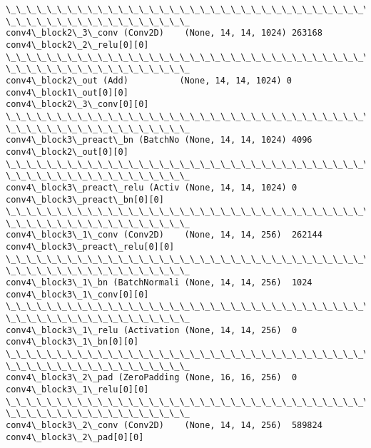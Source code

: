 \documentclass[11pt]{article}
\begin{document}
\begin{Verbatim}[commandchars=\\\{\}]
\_\_\_\_\_\_\_\_\_\_\_\_\_\_\_\_\_\_\_\_\_\_\_\_\_\_\_\_\_\_\_\_\_\_\_\_\_\_\_\_\_\_\_\_\_\_\_\_\_\_\_\_\_\_\_\_\_\_\_\_\_\_\_\_\_\_\_\_\_\_\_\_\_\_\_\_\_\_\_\_
\_\_\_\_\_\_\_\_\_\_\_\_\_\_\_\_\_\_
conv4\_block2\_3\_conv (Conv2D)    (None, 14, 14, 1024) 263168
conv4\_block2\_2\_relu[0][0]
\_\_\_\_\_\_\_\_\_\_\_\_\_\_\_\_\_\_\_\_\_\_\_\_\_\_\_\_\_\_\_\_\_\_\_\_\_\_\_\_\_\_\_\_\_\_\_\_\_\_\_\_\_\_\_\_\_\_\_\_\_\_\_\_\_\_\_\_\_\_\_\_\_\_\_\_\_\_\_\_
\_\_\_\_\_\_\_\_\_\_\_\_\_\_\_\_\_\_
conv4\_block2\_out (Add)          (None, 14, 14, 1024) 0
conv4\_block1\_out[0][0]
conv4\_block2\_3\_conv[0][0]
\_\_\_\_\_\_\_\_\_\_\_\_\_\_\_\_\_\_\_\_\_\_\_\_\_\_\_\_\_\_\_\_\_\_\_\_\_\_\_\_\_\_\_\_\_\_\_\_\_\_\_\_\_\_\_\_\_\_\_\_\_\_\_\_\_\_\_\_\_\_\_\_\_\_\_\_\_\_\_\_
\_\_\_\_\_\_\_\_\_\_\_\_\_\_\_\_\_\_
conv4\_block3\_preact\_bn (BatchNo (None, 14, 14, 1024) 4096
conv4\_block2\_out[0][0]
\_\_\_\_\_\_\_\_\_\_\_\_\_\_\_\_\_\_\_\_\_\_\_\_\_\_\_\_\_\_\_\_\_\_\_\_\_\_\_\_\_\_\_\_\_\_\_\_\_\_\_\_\_\_\_\_\_\_\_\_\_\_\_\_\_\_\_\_\_\_\_\_\_\_\_\_\_\_\_\_
\_\_\_\_\_\_\_\_\_\_\_\_\_\_\_\_\_\_
conv4\_block3\_preact\_relu (Activ (None, 14, 14, 1024) 0
conv4\_block3\_preact\_bn[0][0]
\_\_\_\_\_\_\_\_\_\_\_\_\_\_\_\_\_\_\_\_\_\_\_\_\_\_\_\_\_\_\_\_\_\_\_\_\_\_\_\_\_\_\_\_\_\_\_\_\_\_\_\_\_\_\_\_\_\_\_\_\_\_\_\_\_\_\_\_\_\_\_\_\_\_\_\_\_\_\_\_
\_\_\_\_\_\_\_\_\_\_\_\_\_\_\_\_\_\_
conv4\_block3\_1\_conv (Conv2D)    (None, 14, 14, 256)  262144
conv4\_block3\_preact\_relu[0][0]
\_\_\_\_\_\_\_\_\_\_\_\_\_\_\_\_\_\_\_\_\_\_\_\_\_\_\_\_\_\_\_\_\_\_\_\_\_\_\_\_\_\_\_\_\_\_\_\_\_\_\_\_\_\_\_\_\_\_\_\_\_\_\_\_\_\_\_\_\_\_\_\_\_\_\_\_\_\_\_\_
\_\_\_\_\_\_\_\_\_\_\_\_\_\_\_\_\_\_
conv4\_block3\_1\_bn (BatchNormali (None, 14, 14, 256)  1024
conv4\_block3\_1\_conv[0][0]
\_\_\_\_\_\_\_\_\_\_\_\_\_\_\_\_\_\_\_\_\_\_\_\_\_\_\_\_\_\_\_\_\_\_\_\_\_\_\_\_\_\_\_\_\_\_\_\_\_\_\_\_\_\_\_\_\_\_\_\_\_\_\_\_\_\_\_\_\_\_\_\_\_\_\_\_\_\_\_\_
\_\_\_\_\_\_\_\_\_\_\_\_\_\_\_\_\_\_
conv4\_block3\_1\_relu (Activation (None, 14, 14, 256)  0
conv4\_block3\_1\_bn[0][0]
\_\_\_\_\_\_\_\_\_\_\_\_\_\_\_\_\_\_\_\_\_\_\_\_\_\_\_\_\_\_\_\_\_\_\_\_\_\_\_\_\_\_\_\_\_\_\_\_\_\_\_\_\_\_\_\_\_\_\_\_\_\_\_\_\_\_\_\_\_\_\_\_\_\_\_\_\_\_\_\_
\_\_\_\_\_\_\_\_\_\_\_\_\_\_\_\_\_\_
conv4\_block3\_2\_pad (ZeroPadding (None, 16, 16, 256)  0
conv4\_block3\_1\_relu[0][0]
\_\_\_\_\_\_\_\_\_\_\_\_\_\_\_\_\_\_\_\_\_\_\_\_\_\_\_\_\_\_\_\_\_\_\_\_\_\_\_\_\_\_\_\_\_\_\_\_\_\_\_\_\_\_\_\_\_\_\_\_\_\_\_\_\_\_\_\_\_\_\_\_\_\_\_\_\_\_\_\_
\_\_\_\_\_\_\_\_\_\_\_\_\_\_\_\_\_\_
conv4\_block3\_2\_conv (Conv2D)    (None, 14, 14, 256)  589824
conv4\_block3\_2\_pad[0][0]

\end{Verbatim}
\end{document}
